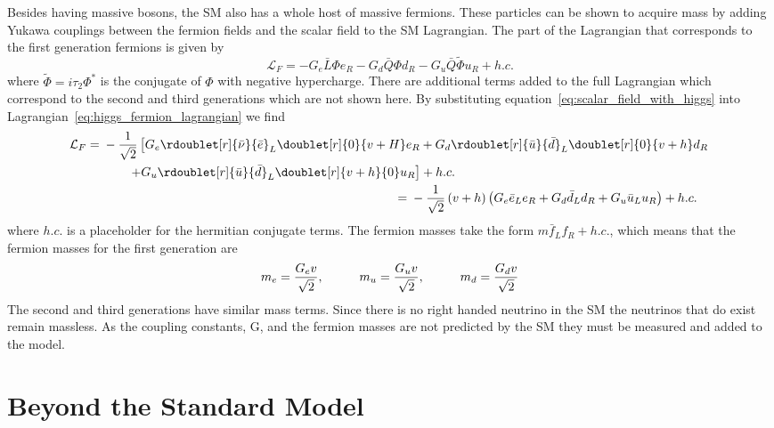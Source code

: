 Besides having massive bosons, the SM also has a whole host of massive fermions.
These particles can be shown to acquire mass by adding Yukawa couplings between the fermion fields and the scalar field to the SM Lagrangian.
The part of the Lagrangian that corresponds to the first generation fermions is given by
\begin{equation}\label{eq:higgs_fermion_lagrangian}
	\mathcal{L}_{F}=-G_{e}\bar{L}{\Phi}e_{R}-G_{d}\bar{Q}{\Phi}d_{R}-G_{u}\bar{Q}\tilde{\Phi}u_{R}+h.c.
\end{equation}
where $\tilde{\Phi}=i\tau_{2}\Phi^{*}$ is the conjugate of $\Phi$ with negative hypercharge.
There are additional terms added to the full Lagrangian which correspond to the second and third generations which are not shown here.
By substituting equation~\ref{eq:scalar_field_with_higgs} into Lagrangian~\ref{eq:higgs_fermion_lagrangian} we find
\begin{align}
	\begin{split}
		\mathcal{L}_{F}={}&-\frac{1}{\sqrt{2}}\left[G_{e}\rdoublet[r]{\bar{\nu}}{\bar{e}}_{L}\doublet[r]{0}{v+H}e_{R}+G_{d}\rdoublet[r]{\bar{u}}{\bar{d}}_{L}\doublet[r]{0}{v+h}d_{R}\right.\\
		&\qquad \left. +G_{u}\rdoublet[r]{\bar{u}}{\bar{d}}_{L}\doublet[r]{v+h}{0}u_{R}\right]+h.c.
	\end{split}\\
	\begin{split}
		={}&-\frac{1}{\sqrt{2}}\left(v+h\right)\left(G_{e}\bar{e}_{L}e_{R}+G_{d}\bar{d}_{L}d_{R}+G_{u}\bar{u}_{L}u_{R}\right)+h.c.
	\end{split}
\end{align}
where $h.c.$ is a placeholder for the hermitian conjugate terms.
The fermion masses take the form $m\bar{f}_{L}f_{R}+h.c.$, which means that the fermion masses for the first generation are
\begin{equation}
	m_{e}=\frac{G_{e}v}{\sqrt{2}},\hspace*{1cm}m_{u}=\frac{G_{u}v}{\sqrt{2}},\hspace*{1cm}m_{d}=\frac{G_{d}v}{\sqrt{2}}
\end{equation}
The second and third generations have similar mass terms.
Since there is no right handed neutrino in the SM the neutrinos that do exist remain massless.
As the coupling constants, G, and the fermion masses are not predicted by the SM they must be measured and added to the model.

\section{Beyond the Standard Model}
\label{sec:BSM}

